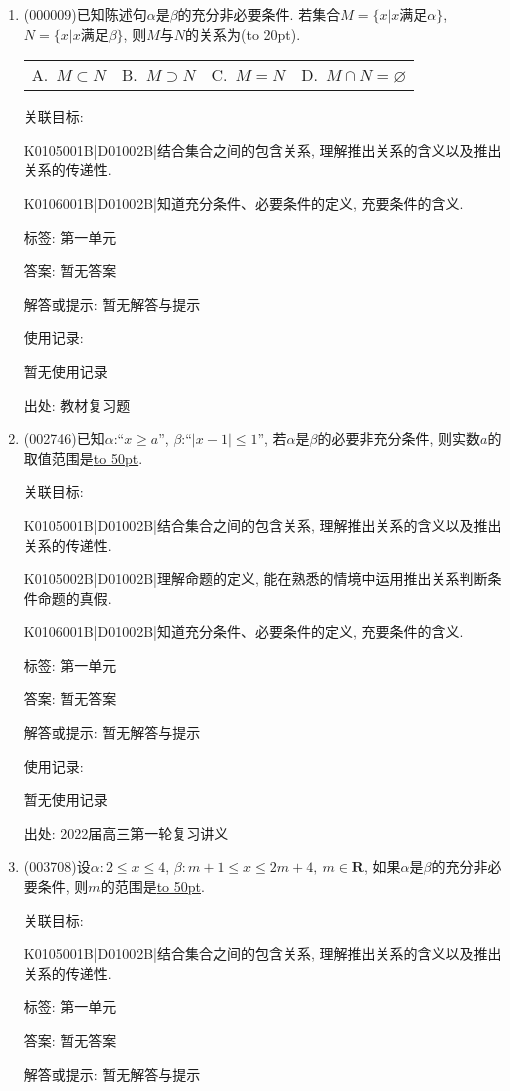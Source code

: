 \documentclass[10pt,a4paper]{article}
\newcommand{\blank}[1]{\underline{\hbox to #1pt{}}}
\newcommand{\bracket}[1]{(\hbox to #1pt{})}
\newcommand{\fourch}[4]{\par\begin{tabular}{p{.23\textwidth}p{.23\textwidth}p{.23\textwidth}p{.23\textwidth}}
A.~#1 &B.~#2& C.~#3& D.~#4
\end{tabular}}
\begin{document}
\begin{enumerate}[1.]

\item { (000009)}已知陈述句$\alpha$是$\beta$的充分非必要条件. 若集合$M=\{x|x\text{满足}\alpha\}$, $N=\{x|x\text{满足}\beta\}$, 则$M$与$N$的关系为\bracket{20}.
\fourch{$M\subset N$}{$M\supset N$}{$M=N$}{$M\cap N=\varnothing$}


关联目标:

K0105001B|D01002B|结合集合之间的包含关系, 理解推出关系的含义以及推出关系的传递性.

K0106001B|D01002B|知道充分条件、必要条件的定义, 充要条件的含义.



标签: 第一单元

答案: 暂无答案

解答或提示: 暂无解答与提示

使用记录:

暂无使用记录


出处: 教材复习题
\item { (002746)}已知$\alpha$:``$x\ge a$'', $\beta$:``$|x-1|\le 1$'', 若$\alpha$是$\beta$的必要非充分条件, 则实数$a$的取值范围是\blank{50}.


关联目标:

K0105001B|D01002B|结合集合之间的包含关系, 理解推出关系的含义以及推出关系的传递性.

K0105002B|D01002B|理解命题的定义, 能在熟悉的情境中运用推出关系判断条件命题的真假.

K0106001B|D01002B|知道充分条件、必要条件的定义, 充要条件的含义.



标签: 第一单元

答案: 暂无答案

解答或提示: 暂无解答与提示

使用记录:

暂无使用记录


出处: 2022届高三第一轮复习讲义
\item { (003708)}设$\alpha:2\le x\le 4$, $\beta: m+1\le x\le 2m+4, \ m\in \mathbf{R}$, 如果$\alpha$是$\beta$的充分非必要条件, 则$m$的范围是\blank{50}.


关联目标:

K0105001B|D01002B|结合集合之间的包含关系, 理解推出关系的含义以及推出关系的传递性.



标签: 第一单元

答案: 暂无答案

解答或提示: 暂无解答与提示


\end{enumerate}
\end{document}

